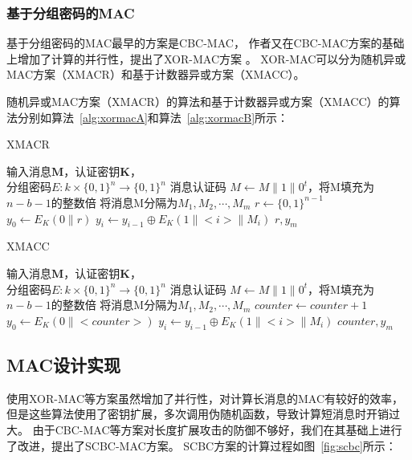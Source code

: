 \subsubsection{基于分组密码的MAC}
基于分组密码的MAC最早的方案是CBC-MAC，
作者又在CBC-MAC方案的基础上增加了计算的并行性，提出了XOR-MAC方案
。
XOR-MAC可以分为随机异或MAC方案（XMACR）和基于计数器异或方案（XMACC）。

随机异或MAC方案（XMACR）的算法和基于计数器异或方案（XMACC）的算法分别如算法~\ref{alg:xormacA}和算法~\ref{alg:xormacB}所示：
\begin{algorithm}[htbp]
  \caption{XMACR}
  \label{alg:xormacA}
  \begin{algorithmic}[1]
    \REQUIRE 输入消息$\mathbf{M}$，认证密钥$\mathbf{K}$，\\
            分组密码$E:k\times \{0,1\}^n \rightarrow \{0,1\}^n$
    \ENSURE 消息认证码
    \STATE $M \leftarrow M\| 1\|0^t$，将M填充为$n-b-1$的整数倍
        \STATE 将消息M分隔为$M_1,M_2,\cdots,M_m$
    \ENDIF
    \STATE $r \leftarrow \{0,1\}^{n-1}$
    \STATE $y_0\leftarrow E_K(0\|r)$
        \STATE $y_i \leftarrow y_{i-1}\oplus E_K(1\|<i>\|M_i)$
    \ENDFOR
    \RETURN $r,y_m$
  \end{algorithmic}
\end{algorithm}


\begin{algorithm}[htbp]
  \caption{XMACC}
  \label{alg:xormacB}
  \begin{algorithmic}[1]
    \REQUIRE 输入消息$\mathbf{M}$，认证密钥$\mathbf{K}$，\\
            分组密码$E:k\times \{0,1\}^n \rightarrow \{0,1\}^n$
    \ENSURE 消息认证码
    \STATE $M \leftarrow M\| 1\|0^t$，将M填充为$n-b-1$的整数倍
        \STATE 将消息M分隔为$M_1,M_2,\cdots,M_m$
    \ENDIF
    \STATE $counter \leftarrow counter+1$
    \STATE $y_0\leftarrow E_K(0\|<counter>)$
        \STATE $y_i \leftarrow y_{i-1}\oplus E_K(1\|<i>\|M_i)$
    \ENDFOR
    \RETURN $counter,y_m$
  \end{algorithmic}
\end{algorithm}

\subsection{MAC设计实现}

使用XOR-MAC等方案虽然增加了并行性，对计算长消息的MAC有较好的效率，但是这些算法使用了密钥扩展，多次调用伪随机函数，导致计算短消息时开销过大。
由于CBC-MAC等方案对长度扩展攻击的防御不够好，我们在其基础上进行了改进，提出了SCBC-MAC方案。
SCBC方案的计算过程如图~\ref{fig:scbc}所示：

